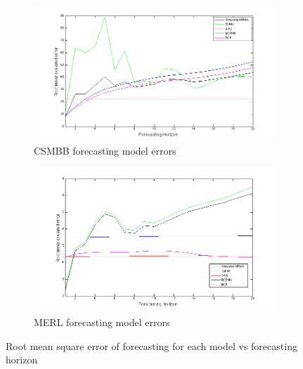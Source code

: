 \documentclass{acm_proc_article-sp}
\begin{document}
\begin{figure}[t!]
\centering
\begin{subfigure}{.45\textwidth}
  \centering
  \includegraphics[width=1.0\linewidth]{rmse_brown.png}
  \caption{CSMBB forecasting model errors}
  \label{fig:csmrmse}
\end{subfigure}
\begin{subfigure}{.45\textwidth}
  \centering
  \includegraphics[width=1.0\linewidth]{rmse_merl.png}
  \caption{MERL forecasting model errors}
  \label{fig:merlrmse}
\end{subfigure}
\caption{Root mean square error of forecasting for each model vs forecasting horizon}
\label{fig:rmseplot}
\end{figure}
\end{document}
